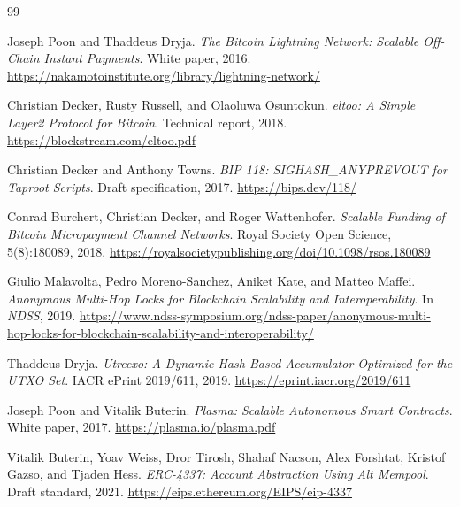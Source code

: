 \documentclass[11pt,a4paper]{article}
\begin{document}
\begin{thebibliography}{99}

Joseph Poon and Thaddeus Dryja.
\newblock \emph{The Bitcoin Lightning Network: Scalable Off-Chain Instant Payments}.
\newblock White paper, 2016.
\newblock \url{https://nakamotoinstitute.org/library/lightning-network/}

Christian Decker, Rusty Russell, and Olaoluwa Osuntokun.
\newblock \emph{eltoo: A Simple Layer2 Protocol for Bitcoin}.
\newblock Technical report, 2018.
\newblock \url{https://blockstream.com/eltoo.pdf}

Christian Decker and Anthony Towns.
\newblock \emph{BIP 118: SIGHASH\_ANYPREVOUT for Taproot Scripts}.
\newblock Draft specification, 2017.
\newblock \url{https://bips.dev/118/}

Conrad Burchert, Christian Decker, and Roger Wattenhofer.
\newblock \emph{Scalable Funding of Bitcoin Micropayment Channel Networks}.
\newblock Royal Society Open Science, 5(8):180089, 2018.
\newblock \url{https://royalsocietypublishing.org/doi/10.1098/rsos.180089}

Giulio Malavolta, Pedro Moreno-Sanchez, Aniket Kate, and Matteo Maffei.
\newblock \emph{Anonymous Multi-Hop Locks for Blockchain Scalability and Interoperability}.
\newblock In \emph{NDSS}, 2019.
\newblock \url{https://www.ndss-symposium.org/ndss-paper/anonymous-multi-hop-locks-for-blockchain-scalability-and-interoperability/}

Thaddeus Dryja.
\newblock \emph{Utreexo: A Dynamic Hash-Based Accumulator Optimized for the UTXO Set}.
\newblock IACR ePrint 2019/611, 2019.
\newblock \url{https://eprint.iacr.org/2019/611}

Joseph Poon and Vitalik Buterin.
\newblock \emph{Plasma: Scalable Autonomous Smart Contracts}.
\newblock White paper, 2017.
\newblock \url{https://plasma.io/plasma.pdf}

Vitalik Buterin, Yoav Weiss, Dror Tirosh, Shahaf Nacson, Alex Forshtat, Kristof Gazso, and Tjaden Hess.
\newblock \emph{ERC-4337: Account Abstraction Using Alt Mempool}.
\newblock Draft standard, 2021.
\newblock \url{https://eips.ethereum.org/EIPS/eip-4337}

\end{thebibliography}
\end{document}

